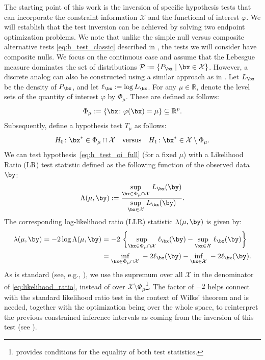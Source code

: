 \documentclass[11pt]{article}
\numberwithin{equation}{section}
\numberwithin{figure}{section}
\begin{document}
The starting point of this work is the inversion of specific hypothesis tests that can incorporate the constraint information $\mathcal X$ and the functional of interest $\varphi$. 
We will establish that the test inversion can be achieved by solving two endpoint optimization problems. 
We note that unlike the simple null versus composite alternative tests \eqref{eq:h_test_classic} described in , the tests we will consider have composite nulls. We focus on the continuous case and assume that the Lebesgue measure dominates the set of distributions $\mathcal P := \{P_{\bx} \mid \bx \in \mathcal X\}$.
However, a discrete analog can also be constructed using a similar approach as in \cite{Feldman_1998}. 
Let $L_\bx$ be the density of $P_\bx$, and let $\ell_\bx := \log L_\bx$. 
For any $\mu \in \mathbb{R}$, denote the level sets of the quantity of interest $\varphi$ by $\Phi_\mu$. These are defined as follows: 
\begin{equation} \label{eq:affine_subspace}
    \Phi_\mu := \{\bx \colon \varphi(\bx) = \mu \} \subseteq \mathbb{R}^p.
\end{equation}
Subsequently, define a hypothesis test $T_\mu$ as follows:
\begin{equation} \label{eq:h_test_oi_full}
    H_0 \colon \bx^* \in \Phi_\mu \cap \mathcal{X} \quad \text{versus} \quad H_1 \colon \bx^* \in \mathcal{X} \setminus \Phi_\mu.
\end{equation}
We can test hypothesis~\eqref{eq:h_test_oi_full} (for a fixed $\mu$) with a Likelihood Ratio (LR) test statistic defined as the following function of the observed data $\by$:
\begin{equation} \label{eq:likelihood_ratio}
    \Lambda(\mu, \by) := \frac{\underset{\bx \in \Phi_\mu \cap \mathcal{X}}{\text{sup}} \; L_{\bx}(\by)}{\underset{\bx \in \mathcal{X}}{\text{sup}} \; L_{\bx}(\by)}.
\end{equation}
The corresponding log-likelihood ratio (LLR) statistic $\lambda(\mu, \by)$ is given by:
\begin{align} \label{eq:log_likelihood_ratio_full}
     \lambda(\mu, \by) = -2 \log \Lambda(\mu, \by) &= -2 ~ \bigg\{\underset{\bx \in \Phi_\mu \cap \mathcal{X}}{\text{sup}} \; \ell_{\bx}(\by)- \underset{\bx \in \mathcal{X}}{\text{sup}} \; \ell_{\bx}(\by) \bigg\} \\ &= \underset{\bx \in \Phi_\mu \cap \mathcal{X}} {\text{inf}} \; -2\ell_{\bx}(\by)- \underset{\bx \in \mathcal{X}}{\text{inf}} \; -2 \ell_{\bx}(\by). \notag
\end{align}
As is standard (see, e.g., \cite{casella_berger,wasserman2004all}), we use the supremum over all $\mathcal X$ in the denominator of \eqref{eq:likelihood_ratio}, instead of over $\mathcal X \setminus \Phi_\mu$\footnote{\cite{schervish} provides conditions for the equality of both test statistics.}. 
The factor of $-2$ helps connect with the standard likelihood ratio test in the context of Wilks' theorem and is needed, together with the optimization being over the whole space, to reinterpret the previous constrained inference intervals as coming from the inversion of this test (see ). 
\end{document}
